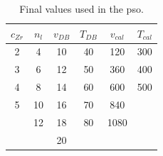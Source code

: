 \begin{table}[ht!]
	\centering
	\caption{Final values used in the \gls{pso}.}
    \label{tab:space}
    \begin{tabular}{cccccc}
        \hline\hline
		$c_{Zr}$	&$n_l$	&$v_{DB}$	&$T_{DB}$	&$v_{cal}$	&$T_{cal}$		\\
        \hline
        2   &4  &10 &40 &120    &300    \\
        3   &6  &12 &50 &360    &400    \\
        4   &8  &14 &60 &600    &500    \\
        5   &10 &16 &70 &840    &       \\
            &12 &18 &80 &1080   &       \\
            &   &20 &   &       &       \\
        \hline\hline
    \end{tabular}
\end{table}


